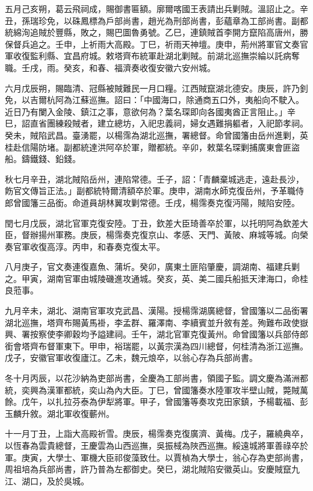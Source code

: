 \begin{pinyinscope}
五月己亥朔，葛云飛祠成，賜御書匾額。廓爾喀國王表請出兵剿賊。溫詔止之。辛丑，孫瑞珍免，以硃鳳標為戶部尚書，趙光為刑部尚書，彭蘊章為工部尚書。副都統綿洵追賊於豐縣，敗之，賜巴圖魯勇號。乙巳，連鎮賊首李開方竄陷高唐州，勝保督兵追之。壬申，上祈雨大高殿。丁巳，祈雨天神壇。庚申，荊州將軍官文奏官軍收復監利縣、宜昌府城。敕塔齊布統軍赴湖北剿賊。前湖北巡撫崇綸以託病奪職。壬戌，雨。癸亥，和春、福濟奏收復安徽六安州城。

六月戊辰朔，賜臨清、冠縣被賊難民一月口糧。江西賊竄湖北德安。庚辰，許乃釗免，以吉爾杭阿為江蘇巡撫。詔曰：「中國海口，除通商五口外，夷船向不駛入。近日乃有闌入金陵、鎮江之事，意欲何為？葉名琛即向各國夷酋正言阻止。」辛巳，詔直省團練殺賊者，建立總坊，入祀忠義祠，婦女遇難捐軀者，入祀節孝祠。癸未，賊陷武昌。臺湧罷，以楊霈為湖北巡撫，署總督。命曾國籓由岳州進剿，英桂赴信陽防堵。副都統達洪阿卒於軍，贈都統。辛卯，敕葉名琛剿捕廣東會匪盜船。鑄鐵錢、鉛錢。

秋七月辛丑，湖北賊陷岳州，連陷常德。壬子，詔：「青麟棄城逃走，遠赴長沙，飭官文傳旨正法。」副都統特爾清額卒於軍。庚申，湖南水師克復岳州，予革職侍郎曾國籓三品銜。命道員胡林翼攻剿常德。壬戌，楊霈奏克復沔陽，賊陷安陸。

閏七月戊辰，湖北官軍克復安陸。丁丑，欽差大臣琦善卒於軍，以托明阿為欽差大臣，督辦揚州軍務。庚辰，楊霈奏克復京山、孝感、天門、黃陂、麻城等城。向榮奏官軍收復高淳。丙申，和春奏克復太平。

八月庚子，官文奏連復嘉魚、蒲圻。癸卯，廣東土匪陷肇慶，調湖南、福建兵剿之。甲寅，湖南官軍由城陵磯進攻通城。癸亥，英、美二國兵船抵天津海口，命桂良蒞事。

九月辛未，湖北、湖南官軍攻克武昌、漢陽。授楊霈湖廣總督，曾國籓以二品銜署湖北巡撫，塔齊布賜黃馬褂，李孟群、羅澤南、李續賓並升敘有差。殉難布政使嶽興、署按察使李卿穀均予謚建祠。壬午，湖北官軍克復黃州。命曾國籓以兵部侍郎銜會塔齊布督軍東下。甲申，裕瑞罷，以黃宗漢為四川總督，何桂清為浙江巡撫。戊子，安徽官軍收復廬江。乙未，魏元烺卒，以翁心存為兵部尚書。

冬十月丙辰，以花沙納為吏部尚書，全慶為工部尚書，領國子監。調文慶為滿洲都統，奕興為漢軍都統，奕山為內大臣。丁巳，曾國籓奏水陸軍攻半壁山賊，斃賊萬餘。戊午，以扎拉芬泰為伊犁將軍。甲子，曾國籓等奏攻克田家鎮，予楊載福、彭玉麟升敘。湖北軍收復蘄州。

十一月丁丑，上詣大高殿祈雪。庚辰，楊霈奏克復廣濟、黃梅。戊子，羅繞典卒，以恆春為雲貴總督，王慶雲為山西巡撫，吳振棫為陜西巡撫。綏遠城將軍善祿卒於軍。庚寅，大學士、軍機大臣祁俊藻致仕。以賈楨為大學士，翁心存為吏部尚書，周祖培為兵部尚書，許乃普為左都御史。癸巳，湖北賊陷安徽英山。安慶賊竄九江、湖口，及於吳城。


\end{pinyinscope}
